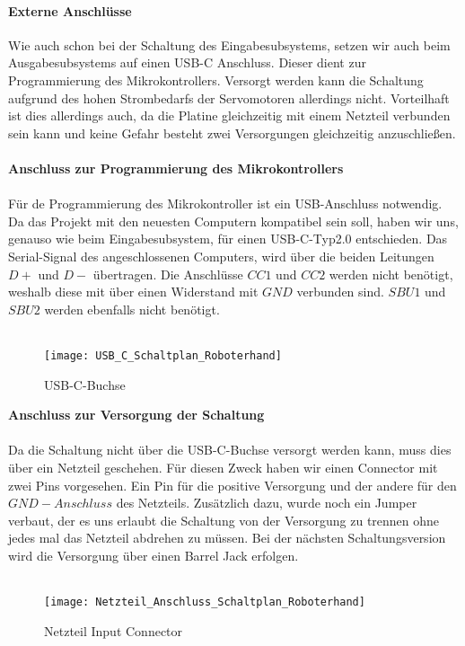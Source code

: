 \documentclass[titlepage,12pt,twoside]{article}
\begin{document}
\paragraph{Externe Anschlüsse}
\hfill \break
\hfill \break
Wie auch schon bei der Schaltung des Eingabesubsystems, setzen wir auch beim Ausgabesubsystems auf einen USB-C Anschluss.
Dieser dient zur Programmierung des Mikrokontrollers. Versorgt werden kann die Schaltung aufgrund des hohen Strombedarfs der Servomotoren
allerdings nicht. Vorteilhaft ist dies allerdings auch, da die Platine gleichzeitig mit einem Netzteil verbunden sein kann und keine 
Gefahr besteht zwei Versorgungen gleichzeitig anzuschließen. \\
\\
\textbf{Anschluss zur Programmierung des Mikrokontrollers} \\
\\
Für de Programmierung des Mikrokontroller ist ein USB-Anschluss notwendig. Da das Projekt mit den neuesten Computern
kompatibel sein soll, haben wir uns, genauso wie beim Eingabesubsystem, für einen USB-C-Typ2.0 entschieden. Das Serial-Signal
des angeschlossenen Computers, wird über die beiden Leitungen $D+$ und $D-$ übertragen. Die Anschlüsse $CC1$ und $CC2$ werden
nicht benötigt, weshalb diese mit über einen Widerstand mit $GND$ verbunden sind. $SBU1$ und $SBU2$ werden ebenfalls nicht 
benötigt. \\
\\
\begin{figure}[H]
	\begin{center}
		\scalebox{0.6}
		{\texttt{[image: USB\_C\_Schaltplan\_Roboterhand]}}
		\caption{USB-C-Buchse}
		\label{fig:USB_C_Schaltplan_Roboterhand}		
	\end{center}
\end{figure}
\hfill \break
\textbf{Anschluss zur Versorgung der Schaltung} \\
\\
Da die Schaltung nicht über die USB-C-Buchse versorgt werden kann, muss dies über ein Netzteil geschehen. Für diesen Zweck
haben wir einen Connector mit zwei Pins vorgesehen. Ein Pin für die positive Versorgung und der andere für den $GND-Anschluss$
des Netzteils.  Zusätzlich dazu, wurde noch ein Jumper verbaut, der es uns erlaubt die Schaltung von der Versorgung zu trennen
ohne jedes mal das Netzteil abdrehen zu müssen. Bei der nächsten Schaltungsversion wird die Versorgung über einen Barrel Jack
erfolgen. \\
\\
\begin{figure}[H]
	\begin{center}
		\scalebox{0.6}
		{\texttt{[image: Netzteil\_Anschluss\_Schaltplan\_Roboterhand]}}
		\caption{Netzteil Input Connector}
		\label{fig:Netzteil_Anschluss_Schaltplan_Roboterhand}		
	\end{center}
\end{figure}
\hfill \break
\end{document}
